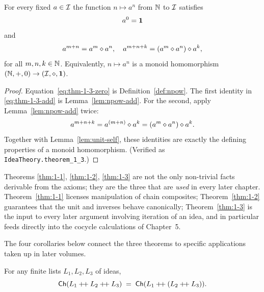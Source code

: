 \begin{theorem}\label{thm:1-3}
For every fixed $a \in \mathcal{I}$ the function $n \mapsto a^n$ from $\mathbb{N}$ to
$\mathcal{I}$ satisfies
\begin{equation}\label{eq:thm-1-3-zero}
a^0 = \mathbf{1}
\end{equation}
and
\begin{equation}\label{eq:thm-1-3-add}
a^{m+n} = a^m \mathbin{\diamond} a^n,
\quad
a^{m+n+k} = (a^m \mathbin{\diamond} a^n) \mathbin{\diamond} a^k,
\end{equation}
for all $m, n, k \in \mathbb{N}$.  Equivalently, $n \mapsto a^n$ is a monoid
homomorphism $(\mathbb{N}, +, 0) \to (\mathcal{I},\mathbin{\diamond},\mathbf{1})$.
\end{theorem}

\begin{proof}
Equation~\eqref{eq:thm-1-3-zero} is Definition~\ref{def:npow}.  The first
identity in \eqref{eq:thm-1-3-add} is Lemma~\ref{lem:npow-add}.  For the
second, apply Lemma~\ref{lem:npow-add} twice:
\[
a^{m+n+k} = a^{(m+n)} \mathbin{\diamond} a^k
        = (a^m \mathbin{\diamond} a^n) \mathbin{\diamond} a^k.
\]
Together with Lemma~\ref{lem:unit-self}, these identities are exactly the
defining properties of a monoid homomorphism.  (Verified as
\texttt{IdeaTheory.theorem\_1\_3}.)
\end{proof}

\begin{remark}
Theorems \ref{thm:1-1}, \ref{thm:1-2}, \ref{thm:1-3} are not the only
non-trivial facts derivable from the axioms; they are the three that are
\emph{used} in every later chapter.  Theorem~\ref{thm:1-1} licenses
manipulation of chain composites; Theorem~\ref{thm:1-2} guarantees that
the unit and inverses behave canonically; Theorem~\ref{thm:1-3} is the
input to every later argument involving iteration of an idea, and in
particular feeds directly into the cocycle calculations of Chapter~5.
\end{remark}

The four corollaries below connect the three theorems to specific
applications taken up in later volumes.

\begin{corollary}\label{cor:1-1}
For any finite lists $L_1, L_2, L_3$ of ideas,
\begin{equation}\label{eq:cor-1-1}
\mathsf{Ch}(L_1 \mathbin{+\!+} L_2 \mathbin{+\!+} L_3)
\;=\; \mathsf{Ch}(L_1 \mathbin{+\!+} (L_2 \mathbin{+\!+} L_3)).
\end{equation}
\end{corollary}

